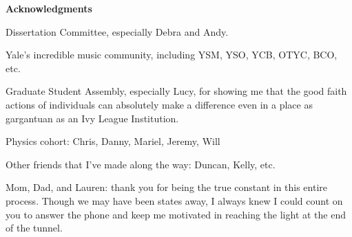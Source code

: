 \begin{center}
{\bf \large Acknowledgments}
\end{center}

Dissertation Committee, especially Debra and Andy.

Yale's incredible music community, including YSM, YSO, YCB, OTYC, BCO, etc.

Graduate Student Assembly, especially Lucy, for showing me that the good faith actions of individuals can absolutely make a difference even in a place as gargantuan as an Ivy League Institution.

Physics cohort: Chris, Danny, Mariel, Jeremy, Will

Other friends that I've made along the way: Duncan, Kelly, etc.

Mom, Dad, and Lauren: thank you for being the true constant in this entire process. Though we may have been states away, I always knew I could count on you to answer the phone and keep me motivated in reaching the light at the end of the tunnel.